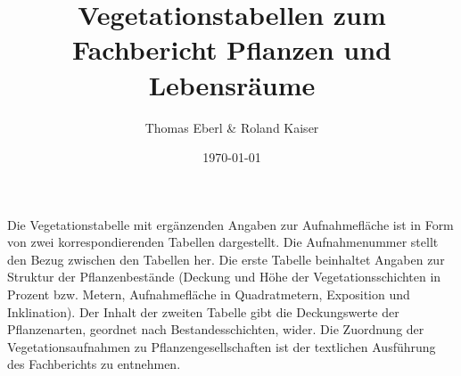 \documentclass[9pt,BCOR=0mm,a4paper,oneside,DIV=11]{scrartcl}
\title{Vegetationstabellen zum Fachbericht Pflanzen und Lebensräume}
\author{Thomas Eberl \& Roland Kaiser}
\date{\today}
\begin{document}
\maketitle

\noindent
Die Vegetationstabelle mit ergänzenden Angaben zur Aufnahmefläche ist in Form von zwei korrespondierenden Tabellen dargestellt. Die Aufnahmenummer stellt den Bezug zwischen den Tabellen her. Die erste Tabelle beinhaltet Angaben zur Struktur der Pflanzenbestände (Deckung und Höhe der Vegetationsschichten in Prozent bzw. Metern, Aufnahmefläche in Quadratmetern, Exposition und Inklination).
Der Inhalt der zweiten Tabelle gibt die Deckungswerte der Pflanzenarten, geordnet nach Bestandesschichten, wider. Die Zuordnung der Vegetationsaufnahmen zu Pflanzengesellschaften ist der textlichen Ausführung des Fachberichts zu entnehmen.

\pagestyle{useheadings}

	
\end{document}
